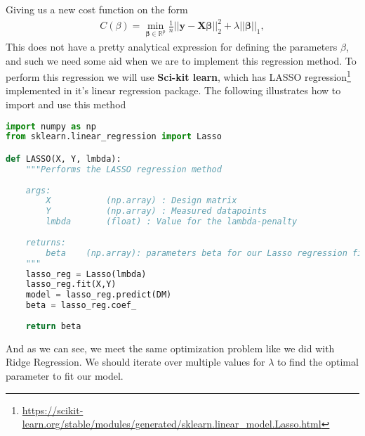 \documentclass[../main.tex]{subfiles}
\begin{document}
Giving us a new cost function on the form
\begin{align*}
    C(\beta) = 
    \min_{\boldsymbol{\beta}\in
{\mathbb{R}}^{p}}\frac{1}{n}\vert\vert \boldsymbol{y}-\boldsymbol{X}\boldsymbol{\beta}\vert\vert_2^2+\lambda\vert\vert \boldsymbol{\beta}\vert\vert_1 ,
\end{align*}
This does not have a pretty analytical expression for defining the parameters $\beta$, and such we need some aid when we are to implement this regression method. To perform this regression we will use \textbf{Sci-kit learn}, which has LASSO regression\footnote{\url{https://scikit-learn.org/stable/modules/generated/sklearn.linear_model.Lasso.html}} implemented in it's linear regression package. The following illustrates how to import and use this method
\newpage
\begin{lstlisting}[language=Python]
import numpy as np
from sklearn.linear_regression import Lasso

def LASSO(X, Y, lmbda):
    """Performs the LASSO regression method
    
    args:
        X           (np.array) : Design matrix 
        Y           (np.array) : Measured datapoints
        lmbda       (float) : Value for the lambda-penalty 
    
    returns:
        beta    (np.array): parameters beta for our Lasso regression fit
    """
    lasso_reg = Lasso(lmbda)
    lasso_reg.fit(X,Y)
    model = lasso_reg.predict(DM)
    beta = lasso_reg.coef_
    
    return beta
\end{lstlisting}
\label{code:LASSO}
\vskip0.1in
And as we can see, we meet the same optimization problem like we did with Ridge Regression. We should iterate over multiple values for $\lambda$ to find the optimal parameter to fit our model.



\end{document}
